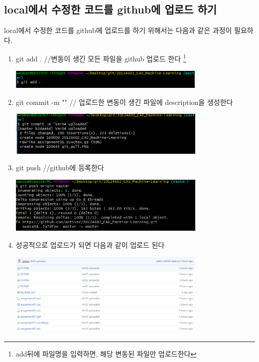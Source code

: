 \documentclass[12pt]{article}
\begin{document}
		\subsection{local에서 수정한 코드를 github에 업로드 하기}
	local에서 수정한 코드를 github에 업로드를 하기 위해서는 다음과 같은 과정이 필요하다.
	\begin{mdframed}[
		linecolor= black,
		roundcorner=10pt,
		innertopmargin =\topskip,
		leftmargin = 0.5cm,
		rightmargin = 0.5cm,
		frametitleaboveskip = 0.5pt,
		frametitlerulewidth = 0.5pt,
		frametitlealignment =,
		frametitlebackgroundcolor = yellow,			
		frametitle = {githhub에 수정된 파일 올리기}	]
		\begin{enumerate}
			\item git add . //변동이 생긴 모든 파일을 github 업로드 한다 \footnote{add뒤에 파일명을 입력하면, 해당 변동된 파일만 업로드한다}
			
			\includegraphics[width=0.75\textwidth]{add}
			
			\item git commit -m "" // 업로드한 변동이 생긴 파일에 description을 생성한다			
			
			\includegraphics[width=0.75\textwidth]{commit}
			
			\item git push //github에 등록한다
			
			\includegraphics[width=0.75\textwidth]{push}
			
			\item 성공적으로 업로드가 되면 다음과 같이 업로드 된다
			
			\includegraphics[width=0.75\textwidth]{result}
		\end{enumerate}  		
	\end{mdframed} 
\end{document}
